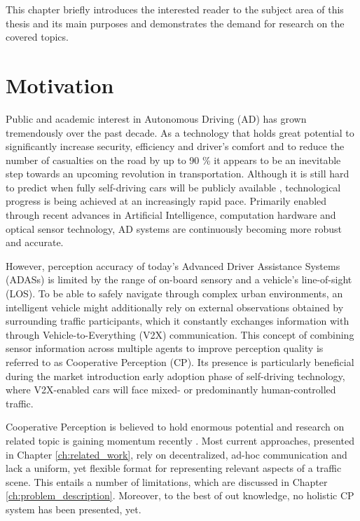 This chapter briefly introduces the interested reader to the subject area of this thesis and its main purposes and demonstrates the demand for research on the covered topics. 

\section{Motivation}
\label{sec:motivation}
Public and academic interest in Autonomous Driving (AD) has grown tremendously over the past decade. As a technology that holds great potential to significantly increase security, efficiency and driver's comfort and to reduce the number of casualties on the road by up to 90 \% \cite{Markwalter2017} it appears to be an inevitable step towards an upcoming revolution in transportation.
Although it is still hard to predict when fully self-driving cars will be publicly available \cite{Frost&SulivanConsulting2018}, technological progress is being achieved at an increasingly rapid pace. Primarily enabled through recent advances in Artificial Intelligence, computation hardware and optical sensor technology, AD systems are continuously becoming more robust and accurate.
\par
\bigskip

However, perception accuracy of today's Advanced Driver Assistance Systems (ADASs) is limited by the range of on-board sensory and a vehicle's line-of-sight (LOS). To be able to safely navigate through complex urban environments, an intelligent vehicle might additionally rely on external observations obtained by surrounding traffic participants, which it constantly exchanges information with through Vehicle-to-Everything (V2X) communication. This concept of combining sensor information across multiple agents to improve perception quality is referred to as Cooperative Perception (CP). Its presence is particularly beneficial during the market introduction early adoption phase of self-driving technology, where V2X-enabled cars will face mixed- or predominantly human-controlled traffic.  
\par
\bigskip

Cooperative Perception is believed to hold enormous potential \cite{Gunther2015} and research on related topic is gaining momentum recently \cite{Chen2019, Thandavarayan2019, Calvo2017}. Most current approaches, presented in Chapter \ref{ch:related_work}, rely on decentralized, ad-hoc communication and lack a uniform, yet flexible format for representing relevant aspects of a traffic scene. This entails a number of limitations, which are discussed in Chapter \ref{ch:problem_description}. Moreover, to the best of out knowledge, no holistic CP system has been presented, yet. 
\par
\bigskip

